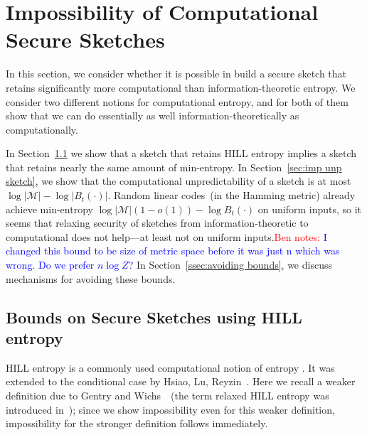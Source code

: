 \documentclass[11pt]{article}
\newcommand{\secref}[1]{\mbox{Section~\ref{#1}}}
\newcommand{\authnote}[2]{{\textcolor{red}{\textsf{#1 notes: }\textcolor{blue}{ #2}}\marginpar{\textcolor{red}{\textbf{!!!!!}}}}}
\newcommand{\authnote}[2]{}
\newcommand{\bnote}[1]{{\authnote{Ben}{#1}}}
\begin{document}
\section{Impossibility of Computational Secure Sketches}
\label{sec:defCompFuzzyExtractors}
In this section, we consider whether it is possible in build a secure sketch that retains significantly more computational than information-theoretic entropy.  We consider two different notions for computational entropy, and for both of them show that we can do essentially as well information-theoretically as computationally.

In \secref{sec:imp HILL sketch} we show that a sketch that retains HILL entropy implies a sketch that retains nearly the same amount of min-entropy.  In \secref{sec:imp unp sketch}, we show that the computational unpredictability of a sketch is at most $\log |\mathcal{M}| - \log |B_t(\cdot)|$.  Random linear codes~(in the Hamming metric) already achieve min-entropy $\log |\mathcal{M}|(1-o(1)) - \log B_t(\cdot)$ on uniform inputs, so it seems that relaxing security of sketches from information-theoretic to computational does not help---at least not on uniform inputs.\bnote{I changed this bound to be size of metric space before it was just n which was wrong.  Do we prefer $n\log Z$?}  In \secref{ssec:avoiding bounds}, we discuss mechanisms for avoiding these bounds.


\subsection{Bounds on Secure Sketches using HILL entropy}
\label{sec:imp HILL sketch}
HILL entropy is a commonly used computational notion of entropy \cite{DBLP:journals/siamcomp/HastadILL99}.  It was extended to the conditional case by Hsiao, Lu, Reyzin~\cite{DBLP:conf/eurocrypt/HsiaoLR07}. Here we recall a weaker definition due to Gentry and Wichs~\cite{gentry2011separating}~(the term relaxed HILL entropy was introduced in~\cite{reyzin2011some}); since we show impossibility even for this weaker definition, impossibility for the stronger definition follows immediately.
\end{document}
